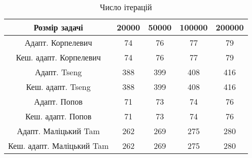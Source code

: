 \begin{table}[H]
	\centering
	\begin{tabular}{|c||c|c|c|c|}\hline
		Розмір задачі & 20000 & 50000 & 100000 & 200000 \\ \hline \hline
		Адапт. Корпелевич & 74 & 76 & 77 & 79 \\ \hline
		Кеш. адапт. Корпелевич & 74 & 76 & 77 & 79 \\ \hline
		Адапт. Tseng & 388 & 399 & 408 & 416 \\ \hline
		Кеш. адапт. Tseng & 388 & 399 & 408 & 416 \\ \hline
		Адапт. Попов & 71 & 73 & 74 & 76 \\ \hline
		Кеш. адапт. Попов & 71 & 73 & 74 & 76 \\ \hline
		Адапт. Маліцький Tam & 262 & 269 & 275 & 280 \\ \hline
		Кеш. адапт. Маліцький Tam & 262 & 269 & 275 & 280 \\ \hline
	\end{tabular}
	\caption{Число ітерацій}
\end{table}
